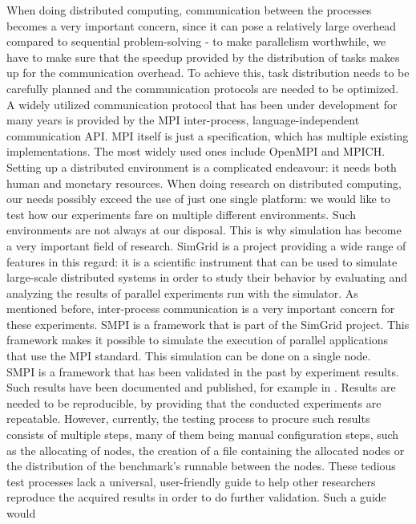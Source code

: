 When doing distributed computing, communication between the processes
becomes a very important concern, since it can pose a relatively large
overhead compared to sequential problem-solving - to make parallelism
worthwhile, we have to make sure that the speedup provided by the
distribution of tasks makes up for the communication overhead. To
achieve this, task distribution needs to be carefully planned and the
communication protocols are needed to be optimized. A widely utilized
communication protocol that has been under development for many years
is provided by the MPI\cite{mpif12} inter-process, language-independent
communication API. MPI itself is just a specification, which has
multiple existing implementations. The most widely used
ones include OpenMPI\cite{ompi04} and MPICH\cite{mpich12}.\\
Setting up a distributed environment is a complicated endeavour: it
needs both human and monetary resources. When doing research on
distributed computing, our needs possibly exceed the use of just one
single platform: we would like to test how our experiments fare on
multiple different environments. Such environments are not always at
our disposal. This is why simulation has become a very important field
of research. SimGrid\cite{clq08} is a project providing a wide range
of features in this regard: it is a scientific instrument that can be
used to simulate large-scale distributed systems in order to study
their behavior by evaluating and analyzing the results of parallel
experiments run with the simulator. As mentioned before, inter-process
communication is a very important concern for these experiments. SMPI
is a framework that is part of the SimGrid project. This framework
makes it possible to simulate the execution of parallel applications
that use the MPI standard. This simulation can be done on a single
node.\\
SMPI is a framework that has been validated in the past by experiment
results. Such results have been documented and published, for example
in \cite{csgscq11}. Results are needed to be reproducible, by
providing that the conducted experiments are repeatable. However,
currently, the testing process to procure such results
consists of multiple steps, many of them being manual configuration
steps, such as the allocating of nodes, the creation of a file
containing the allocated nodes or the distribution of the benchmark's
runnable between the nodes. These tedious test processes lack a
universal, user-friendly guide to help other researchers reproduce the
acquired results in order to do further validation. Such a guide would
